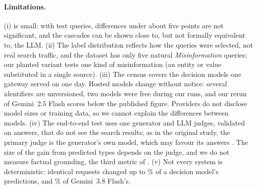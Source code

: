\paragraph{Limitations.}
(i) \conflicts is small: with \ntest test queries, differences under about five points are not significant, and the
cascades can be shown close to, but not formally equivalent to, the LLM. (ii) The label distribution reflects how the
queries were selected, not real search traffic, and the dataset has only five natural \emph{Misinformation}
queries; our planted variant tests one kind of misinformation (an entity or value substituted in a single source).
(iii) The census covers the decision models one gateway served on one day. Hosted models change without notice:
several identifiers are unversioned, two models were free during our runs, and our rerun of Gemini~2.5 Flash scores
below the published figure. Providers
do not disclose model sizes or training data, so we cannot explain the differences between models. (iv) The end-to-end test uses one generator and LLM judges, validated on \nvalid answers, that do not see the
search results; as in the original study, the primary judge is the generator's own model, which may favour its
answers \citep{panickssery2024llm}. The size of the gain from predicted types depends on the judge, and we do not
measure factual grounding, the third metric of \citet{cattan2025dragged}. (v) Not every system is deterministic: identical requests changed
up to \rerunflipmax\% of a decision model's predictions, and \diaggmrerunflip\% of Gemini~3.8 Flash's.
